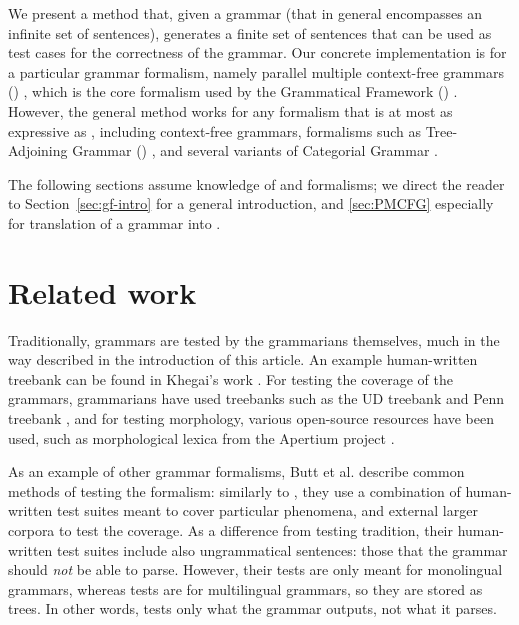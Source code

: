 We present a method that, given a grammar (that in general encompasses
an infinite set of sentences), generates a finite set of sentences
that can be used as test cases for the correctness of the grammar. Our
concrete implementation is for a particular grammar formalism,
namely parallel multiple context-free grammars (\pmcfg)
\cite{seki91pmcfg}, which is the core formalism used by the
Grammatical Framework (\gf) \cite{ranta2004gf}. However, the general
method works for any formalism that is at most as expressive as
\pmcfg{}, including context-free grammars, formalisms such as Tree-Adjoining Grammar (\tagGrammar)
\cite{joshi1975tag}, and several variants of Categorial Grammar
\cite{deGroote2004,steedman1988ccg}.

The following sections assume knowledge of \gf{} and \pmcfg{}
formalisms; we direct the reader to Section~\ref{sec:gf-intro} for a
general \gf{} introduction, and \ref{sec:PMCFG} especially for
translation of a \gf{} grammar into \pmcfg{}.


\section{Related work}

Traditionally, \gf{} grammars are tested by the grammarians themselves,
much in the way described in the introduction of this article. An example
human-written treebank can be found in Khegai's work \cite[p.~136--142]{khegai2006phd}.
For testing the coverage of the grammars, grammarians have used
treebanks such as the UD treebank \cite{nivre2016ud} and Penn treebank
\cite{marcus1993penntreebank}, and for testing morphology, various open-source resources
have been used, such as morphological lexica from the Apertium
project \cite{forcada2011apertium}.

As an example of other grammar formalisms, Butt et al.
\cite[pp.~212--213]{butt1999lfg} describe common methods of testing
the \lfg{} formalism: similarly to \gf, they use a combination of
human-written test suites meant to cover particular phenomena, and
external larger corpora to test the coverage. As a difference from \gf{}
testing tradition, their human-written test suites include also
ungrammatical sentences: those that the grammar should \emph{not} be
able to parse. However, their tests are only meant for monolingual
grammars, whereas \gf{} tests are for multilingual grammars, so they are
stored as trees. In other words, \gf{} tests only what the grammar
outputs, not what it parses.

